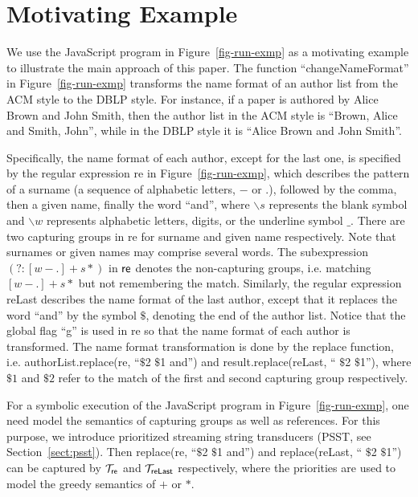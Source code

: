 
\section{Motivating Example}\label{sec:mot}

We use the JavaScript program in Figure~\ref{fig-run-exmp} as a motivating example to illustrate the main approach of this paper. 
The function ``changeNameFormat''  in Figure~\ref{fig-run-exmp} transforms the name format of an author list from the ACM style to the DBLP style. For instance,  if a paper is authored by Alice Brown and John Smith, then the author list in the ACM style is ``Brown, Alice and Smith, John'', while  in the DBLP style it is ``Alice Brown and John Smith''. 

Specifically,  the name format of each author, except for the last one, is specified by the regular expression {\sf re}  in Figure~\ref{fig-run-exmp}, which describes the pattern of a surname (a sequence of alphabetic letters, $-$ or $.$), followed by the comma, then a given name, finally the word ``and'', where $\backslash s$ represents the blank symbol and $\backslash w$ represents alphabetic letters, digits, or the underline symbol $\_$. There are two capturing groups in {\sf re}  for surname and  given name respectively. Note that surnames or given names may comprise several words. The subexpression $(?: [w-.]+s*)$ in ${\sf re}$ denotes the non-capturing groups, i.e. matching $[w-.]+s*$ but not remembering the match.
Similarly, the regular expression {\sf reLast} describes the name format of the last author, except that it replaces the word ``and'' by the symbol $\$$, denoting the end of the author list. Notice that the global flag ``g'' is used in {\sf re} so that the name format of each author is transformed. The name format transformation is done by the {\sf replace} function, i.e. {\sf authorList.replace(re, ``$\$$2 $\$$1 and'')} and  {\sf result.replace(reLast, `` $\$$2 $\$$1'')}, where $\$1$ and $\$2$ refer to the match of the first and second capturing group respectively. 

For a symbolic execution of the JavaScript program in Figure~\ref{fig-run-exmp}, one need model the semantics of capturing groups as well as references. For this purpose, we introduce prioritized streaming string transducers (PSST, see Section~\ref{sect:psst}). Then {\sf replace(re, ``$\$$2 $\$$1 and'')} and {\sf replace(reLast, `` $\$$2 $\$$1'')} can be captured by $\mathcal{T}_{\sf re}$ and $\mathcal{T}_{\sf reLast}$ respectively, where the priorities are used to model the greedy semantics of $+$ or $*$. 

